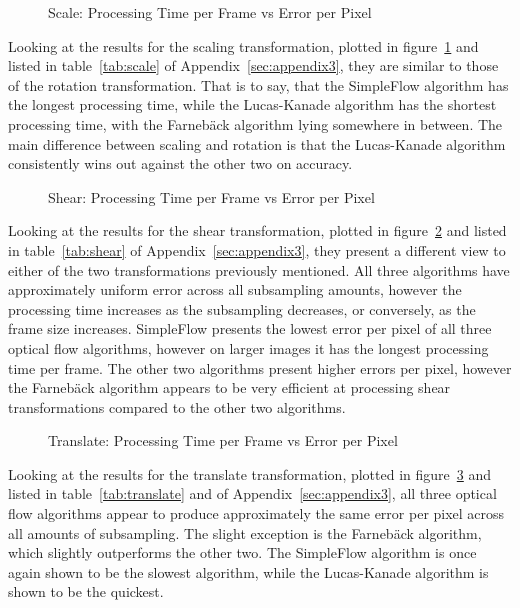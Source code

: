 \begin{figure}[h]
  \centering
  \caption{Scale: Processing Time per Frame vs Error per Pixel}
  \label{fig:scaling}
\end{figure}

Looking at the results for the scaling transformation, plotted in figure~\ref{fig:scaling} and listed in table~\ref{tab:scale} of Appendix~\ref{sec:appendix3}, they are similar to those of the rotation transformation. That is to say, that the SimpleFlow algorithm has the longest processing time, while the Lucas-Kanade algorithm has the shortest processing time, with the Farnebäck algorithm lying somewhere in between. The main difference between scaling and rotation is that the Lucas-Kanade algorithm consistently wins out against the other two on accuracy.

\begin{figure}[h]
  \centering
  \caption{Shear: Processing Time per Frame vs Error per Pixel}
  \label{fig:shear}
\end{figure}

Looking at the results for the shear transformation, plotted in figure~\ref{fig:shear} and listed in table~\ref{tab:shear} of Appendix~\ref{sec:appendix3}, they present a different view to either of the two transformations previously mentioned. All three algorithms have approximately uniform error across all subsampling amounts, however the processing time increases as the subsampling decreases, or conversely, as the frame size increases. SimpleFlow presents the lowest error per pixel of all three optical flow algorithms, however on larger images it has the longest processing time per frame. The other two algorithms present higher errors per pixel, however the Farnebäck algorithm appears to be very efficient at processing shear transformations compared to the other two algorithms.

\begin{figure}[h]
  \centering
  \caption{Translate: Processing Time per Frame vs Error per Pixel}
  \label{fig:translate}
\end{figure}

Looking at the results for the translate transformation, plotted in figure~\ref{fig:translate} and listed in table~\ref{tab:translate} and  of Appendix~\ref{sec:appendix3}, all three optical flow algorithms appear to produce approximately the same error per pixel across all amounts of subsampling. The slight exception is the Farnebäck algorithm, which slightly outperforms the other two. The SimpleFlow algorithm is once again shown to be the slowest algorithm, while the Lucas-Kanade algorithm is shown to be the quickest.

